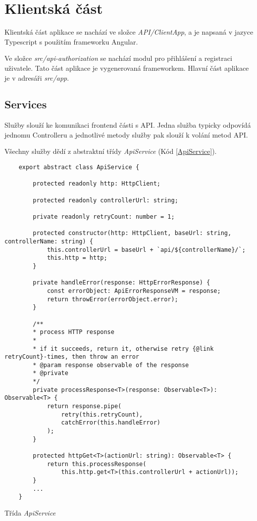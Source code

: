 \section{Klientská část}
\lstset{style=typescript}

Klientská část aplikace se nachází ve složce \textit{API/ClientApp}, a je napsaná v jazyce Typescript s použitím frameworku Angular. 

Ve složce \textit{src/api-authorization} se nachází modul pro přihlášení a registraci uživatele. Tato část aplikace je vygenerovaná frameworkem. Hlavní část aplikace je v adresáři \textit{src/app}.

\subsection{Services}

Služby slouží ke komunikaci frontend části s API. Jedna služba typicky odpovídá jednomu Controlleru a jednotlivé metody služby pak slouží k volání metod API. 

Všechny služby dědí z abstraktní třídy \textit{ApiService} (Kód \ref{ApiService}). 

\begin{program}
	\begin{lstlisting}
	export abstract class ApiService {
	
		protected readonly http: HttpClient;
		
		protected readonly controllerUrl: string;
		
		private readonly retryCount: number = 1;
		
		protected constructor(http: HttpClient, baseUrl: string, controllerName: string) {
			this.controllerUrl = baseUrl + `api/${controllerName}/`;
			this.http = http;
		}
		
		private handleError(response: HttpErrorResponse) {
			const errorObject: ApiErrorResponseVM = response;
			return throwError(errorObject.error);
		}
		
		/**
		* process HTTP response
		*
		* if it succeeds, return it, otherwise retry {@link retryCount}-times, then throw an error
		* @param response observable of the response
		* @private
		*/
		private processResponse<T>(response: Observable<T>): Observable<T> {
			return response.pipe(
				retry(this.retryCount),
				catchError(this.handleError)
			);
		}
		
		protected httpGet<T>(actionUrl: string): Observable<T> {
			return this.processResponse(
				this.http.get<T>(this.controllerUrl + actionUrl));
		}
		...
	}
	\end{lstlisting}
	\caption{Třída \textit{ApiService}}
	\label{ApiService}
\end{program}

